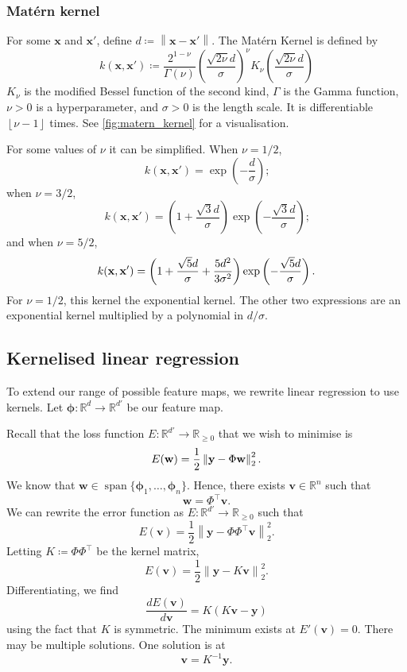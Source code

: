 \documentclass[11pt,twoside,openright]{report}
\newcommand\bphi{\bm{\phi}}
\newcommand\bbR{\mathbb{R}}
\newcommand\bv{\mathbf{v}}
\newcommand\bw{\mathbf{w}}
\newcommand\bx{\mathbf{x}}
\newcommand\by{\mathbf{y}}
\newcommand\norm[1]{\left\|#1\right\|}
\newcommand\floor[1]{\left\lfloor#1\right\rfloor}
\DeclareMathOperator{\spn}{span}
\begin{document}
\subsubsection{Mat\'ern kernel}

For some $\bx$ and $\bx'$, define $d \coloneqq \norm{\bx - \bx'}$. The Mat\'ern Kernel is defined by \[
    k(\bx, \bx') \coloneqq \frac{2^{1-\nu}}{\Gamma(\nu)}\left(\frac{\sqrt{2\nu}d}{\sigma}\right)^\nu K_\nu\left(\frac{\sqrt{2\nu}d}{\sigma}\right)
\]$K_\nu$ is the modified Bessel function of the second kind, $\Gamma$ is the Gamma function, $\nu > 0$ is a hyperparameter, and $\sigma > 0$ is the length scale. It is differentiable $\floor{\nu-1}$ times. See \cref{fig:matern_kernel} for a visualisation.

For some values of $\nu$ it can be simplified. When $\nu = 1/2$,
 \[
   k(\bx, \bx') = \exp\left(-\frac{d}{\sigma}\right) \text{;}
 \] when $\nu=3/2$, \[
   k(\bx, \bx') = \left(1 + \frac{\sqrt{3}d}{\sigma}\right)\exp\left(-\frac{\sqrt{3}d}{\sigma}\right) \text{;}
 \] and when $\nu = 5/2$,\[
  k(\bx, \bx') = \left(1 + \frac{\sqrt{5}d}{\sigma} + \frac{5d^2}{3\sigma^2}\right)\exp\left(-\frac{\sqrt{5}d}{\sigma}\right) \text.
 \] For $\nu=1/2$, this kernel the exponential kernel. The other two expressions are an exponential kernel multiplied by a polynomial in $d/\sigma$.

\subsection{Kernelised linear regression}
To extend our range of possible feature maps, we rewrite linear regression to use kernels. Let $\bphi : \bbR^{d} \to \bbR^{d'}$ be our feature map.

Recall that the loss function $E : \bbR^{d'} \to \bbR_{\geq0}$ that we wish to minimise is \[
    E(\bw) = \frac{1}{2}\norm{\by - \Phi\bw}_2^2 \text.
\] We know that $\bw \in \spn\{\bphi_1, \dots, \bphi_n\}$. Hence, there exists $\bv \in \bbR^n$ such that \[
    \bw = \Phi^\top\bv \text{.}
\] We can rewrite the error function as $E : \bbR^{d'} \to \bbR_{\geq0}$ such that \[
    E(\bv) = \frac{1}{2}\norm{\by - \Phi\Phi^\top\bv}_2^2 \text{.}
\] Letting $K \coloneqq \Phi\Phi^\top$ be the kernel matrix,\[
    E(\bv) = \frac{1}{2}\norm{\by - K\bv}_2^2\text{.}
\] Differentiating, we find \[
    \frac{dE(\bv)}{d\bv} = K(K\bv - \by)
\] using the fact that $K$ is symmetric. The minimum exists at $E'(\bv) = 0$. There may be multiple solutions. One solution is at \[
    \bv = K^{-1}\by \text{.}
\]
\end{document}
